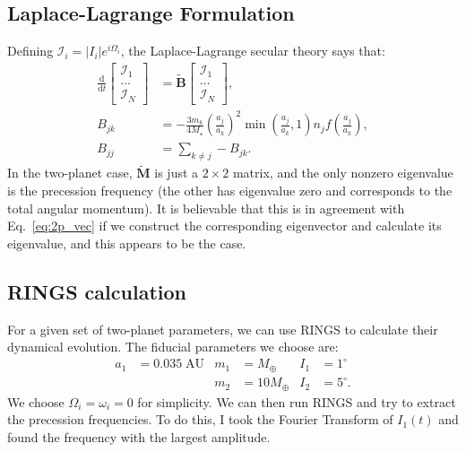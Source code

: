 \documentclass[11pt,
        usenames, %
        dvipsnames %
    ]{article}
\newcommand*{\rd}[2]{\frac{\mathrm{d}#1}{\mathrm{d}#2}}
\newcommand*{\bm}[1]{\boldsymbol{\mathbf{#1}}}
\newcommand*{\abs}[1]{\left|#1\right|}
\newcommand*{\p}[1]{\left(#1\right)}
\begin{document}
\subsection{Laplace-Lagrange Formulation}\label{ss:LL}

Defining $\mathcal{I}_i = \abs{I_i} e^{i\Omega_i}$, the Laplace-Lagrange secular
theory says that:
\begin{align}
    \rd{}{t}\begin{bmatrix}
        \mathcal{I}_1\\\dots\\\mathcal{I}_N
    \end{bmatrix}
        &= \tilde{\bm{B}} \begin{bmatrix}
            \mathcal{I}_1\\\dots\\\mathcal{I}_N
        \end{bmatrix},\\
    B_{jk} &=
        -\frac{3 m_k}{4 M_\star}\p{\frac{a_j}{a_k}}^2
            \min\p{\frac{a_j}{a_k}, 1}
            n_j f\p{\frac{a_j}{a_k}},\\
    B_{jj} &= \sum\limits_{k \neq j}
        -B_{jk}.\label{eq:2p_LL}
\end{align}
In the two-planet case, $\tilde{\bm{M}}$ is just a $2 \times 2$ matrix, and the
only nonzero eigenvalue is the precession frequency (the other has eigenvalue
zero and corresponds to the total angular momentum). It is believable that this
is in agreement with Eq.~\eqref{eq:2p_vec} if we construct the corresponding
eigenvector and calculate its eigenvalue, and this appears to be the case.

\subsection{RINGS calculation}

For a given set of two-planet parameters, we can use RINGS to calculate their
dynamical evolution. The fiducial parameters we choose are:
\begin{align}
    a_1 &= 0.035\;\mathrm{AU} & m_1 &= M_{\oplus} & I_1 &= 1^\circ\\
    && m_2 &= 10M_\oplus & I_2 &= 5^\circ.
\end{align}
We choose $\Omega_i = \omega_i = 0$ for simplicity. We can then run RINGS and
try to extract the precession frequencies. To do this, I took the Fourier
Transform of $I_1(t)$ and found the frequency with the largest amplitude.
\end{document}

